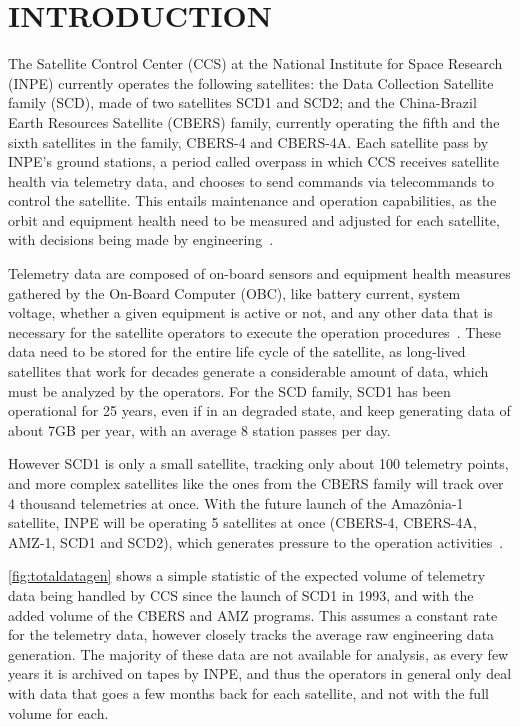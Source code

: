 
\chapter{INTRODUCTION}\label{ch:intro}

The Satellite Control Center (CCS) at the National Institute for Space Research (INPE) currently operates the following satellites: the Data Collection Satellite family (SCD), made of two satellites SCD1 and SCD2; and the China-Brazil Earth Resources Satellite (CBERS) family, currently operating the fifth and the sixth satellites in the family, CBERS-4 and CBERS-4A.
Each satellite pass by INPE's ground stations, a period called overpass in which CCS receives satellite health via telemetry data, and chooses to send commands via telecommands to control the satellite.
This entails maintenance and operation capabilities, as the orbit and equipment health need to be measured and adjusted for each satellite, with decisions being made by engineering~\cite{AzevedoAmbr:2010:ArSaTe}.

Telemetry data are composed of on-board sensors and equipment health measures gathered by the On-Board Computer (OBC), like battery current, system voltage, whether a given equipment is active or not, and any other data that is necessary for the satellite operators to execute the operation procedures~\cite{larsonSpaceMissionAnalysis1999}.
These data need to be stored for the entire life cycle of the satellite, as long-lived satellites that work for decades generate a considerable amount of data, which must be analyzed by the operators.
For the SCD family, SCD1 has been operational for 25 years, even if in an degraded state, and keep generating data of about 7GB per year, with an average 8 station passes per day.

However SCD1 is only a small satellite, tracking only about 100 telemetry points, and more complex satellites like the ones from the CBERS family will track over 4 thousand telemetries at once.
With the future launch of the Amazônia-1 satellite, INPE will be operating 5 satellites at once (CBERS-4, CBERS-4A, AMZ-1, SCD1 and SCD2), which generates pressure to the operation activities~\cite{JulioFoAmbrFerrLour:2017:ChImSp}.

\autoref{fig:totaldatagen} shows a simple statistic of the expected volume of telemetry data being handled by CCS since the launch of SCD1 in 1993, and with the added volume of the CBERS and AMZ programs.
This assumes a constant rate for the telemetry data, however closely tracks the average raw engineering data generation.
The majority of these data are not available for analysis, as every few years it is archived on tapes by INPE, and thus the operators in general only deal with data that goes a few months back for each satellite, and not with the full volume for each.

